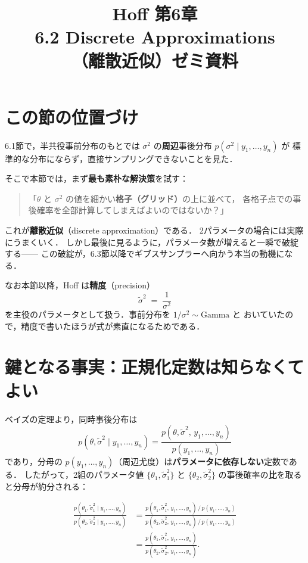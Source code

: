 \documentclass[lualatex,ja=standard,a4paper,12pt]{bxjsarticle}
\title{{\large Hoff 第6章} \\[6pt]
       \textbf{6.2\; Discrete Approximations} \\[4pt]
       {\normalsize （離散近似）ゼミ資料}}
\author{}
\date{}
\begin{document}
\maketitle
\thispagestyle{empty}

\section{この節の位置づけ}

6.1節で，半共役事前分布のもとでは
$\sigma^2$ の\textbf{周辺}事後分布 $p(\sigma^2 \mid y_1, \ldots, y_n)$ が
標準的な分布にならず，直接サンプリングできないことを見た．

\medskip
そこで本節では，まず\textbf{最も素朴な解決策}を試す：
\begin{quote}
「$\theta$ と $\sigma^2$ の値を細かい\textbf{格子（グリッド）}の上に並べて，
各格子点での事後確率を全部計算してしまえばよいのではないか？」
\end{quote}

\noindent これが\textbf{離散近似}（discrete approximation）である．
2パラメータの場合には実際にうまくいく．
しかし最後に見るように，パラメータ数が増えると一瞬で破綻する——
この破綻が，6.3節以降でギブスサンプラーへ向かう本当の動機になる．

\medskip
なお本節以降，Hoff は\textbf{精度}（precision）
\[
  \tilde{\sigma}^2 \;=\; \frac{1}{\sigma^2}
\]
を主役のパラメータとして扱う．事前分布を $1/\sigma^2 \sim \mathrm{Gamma}$ と
おいていたので，精度で書いたほうが式が素直になるためである．

\section{鍵となる事実：正規化定数は知らなくてよい}

ベイズの定理より，同時事後分布は
\[
  p(\theta, \tilde{\sigma}^2 \mid y_1, \ldots, y_n)
  = \frac{p(\theta, \tilde{\sigma}^2,\, y_1, \ldots, y_n)}{p(y_1, \ldots, y_n)}
\]
であり，分母の $p(y_1, \ldots, y_n)$（周辺尤度）は\textbf{パラメータに依存しない}定数である．
したがって，2組のパラメータ値 $\{\theta_1, \tilde{\sigma}_1^2\}$ と
$\{\theta_2, \tilde{\sigma}_2^2\}$ の事後確率の\textbf{比}を取ると分母が約分される：

\begin{align*}
  \frac{p(\theta_1, \tilde{\sigma}_1^2 \mid y_1, \ldots, y_n)}
       {p(\theta_2, \tilde{\sigma}_2^2 \mid y_1, \ldots, y_n)}
  &= \frac{p(\theta_1, \tilde{\sigma}_1^2,\, y_1, \ldots, y_n) \,/\, p(y_1, \ldots, y_n)}
          {p(\theta_2, \tilde{\sigma}_2^2,\, y_1, \ldots, y_n) \,/\, p(y_1, \ldots, y_n)} \\[4pt]
  &= \frac{p(\theta_1, \tilde{\sigma}_1^2,\, y_1, \ldots, y_n)}
          {p(\theta_2, \tilde{\sigma}_2^2,\, y_1, \ldots, y_n)}.
\end{align*}
\end{document}

